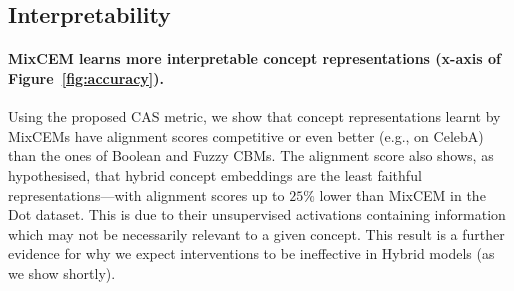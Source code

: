 \documentclass[withindex,glossary]{cam-thesis}
\theoremstyle{plain}
\theoremstyle{definition}
\theoremstyle{remark}
\begin{document}
\subsection{Interpretability}


\paragraph{MixCEM learns more interpretable concept representations (x-axis of Figure~\ref{fig:accuracy}).}
Using the proposed CAS metric, we show that concept representations learnt by MixCEMs have alignment scores competitive or even better (e.g., on CelebA) than the ones of Boolean and Fuzzy CBMs. The alignment score also shows, as hypothesised, that hybrid concept embeddings are the least faithful representations---with alignment scores up to $25\%$ lower than MixCEM in the Dot dataset. This is due to their unsupervised activations containing information which may not be necessarily relevant to a given concept. This result  is a further evidence for why we expect interventions to be ineffective in Hybrid models (as we show shortly).

\end{document}
